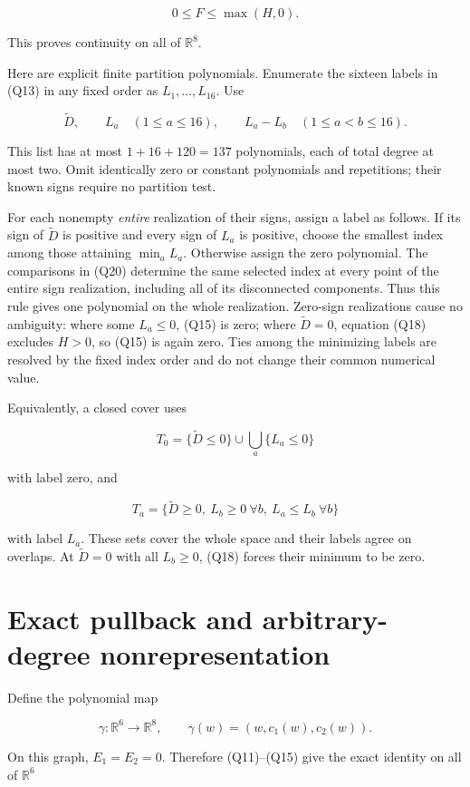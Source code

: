 \documentclass[11pt]{article}
\begin{document}
\[
0\le F\le\max(H,0).
\tag{Q19}
\]

This proves continuity on all of \(\mathbb R^8\).

Here are explicit finite partition polynomials. Enumerate the sixteen
labels in (Q13) in any fixed order as \(L_1,\ldots,L_{16}\). Use

\[
\widetilde D,\qquad L_a\quad(1\le a\le16),\qquad
L_a-L_b\quad(1\le a<b\le16).
\tag{Q20}
\]

This list has at most \(1+16+120=137\) polynomials, each of total
degree at most two. Omit identically zero or constant polynomials and repetitions; their
known signs require no partition test.

For each nonempty \emph{entire} realization of their signs, assign a label as
follows. If its sign of \(\widetilde D\) is positive and every sign of
\(L_a\) is positive, choose the smallest index among those attaining
\(\min_a L_a\). Otherwise assign the zero polynomial. The comparisons
in (Q20) determine the same selected index at every point of the entire
sign realization, including all of its disconnected components. Thus
this rule gives one polynomial on the whole realization. Zero-sign
realizations cause no ambiguity: where some \(L_a\le0\), (Q15) is zero;
where \(\widetilde D=0\), equation (Q18) excludes \(H>0\), so (Q15)
is again zero. Ties among the minimizing labels are resolved by the
fixed index order and do not change their common numerical value.

Equivalently, a closed cover uses

\[
T_0=\{\widetilde D\le0\}\cup\bigcup_a\{L_a\le0\}
\]

with label zero, and

\[
T_a=\{\widetilde D\ge0,\ L_b\ge0\ \forall b,
\ L_a\le L_b\ \forall b\}
\tag{Q21}
\]

with label \(L_a\). These sets cover the whole space and their labels
agree on overlaps. At \(\widetilde D=0\) with all \(L_b\ge0\),
(Q18) forces their minimum to be zero.

\section{Exact pullback and arbitrary-degree nonrepresentation}

Define the polynomial map

\[
\gamma:\mathbb R^6\longrightarrow\mathbb R^8,
\qquad
\gamma(w)=(w,c_1(w),c_2(w)).
\tag{Q22}
\]

On this graph, \(E_1=E_2=0\). Therefore (Q11)--(Q15) give the exact
identity on all of \(\mathbb R^6\)
\end{document}
